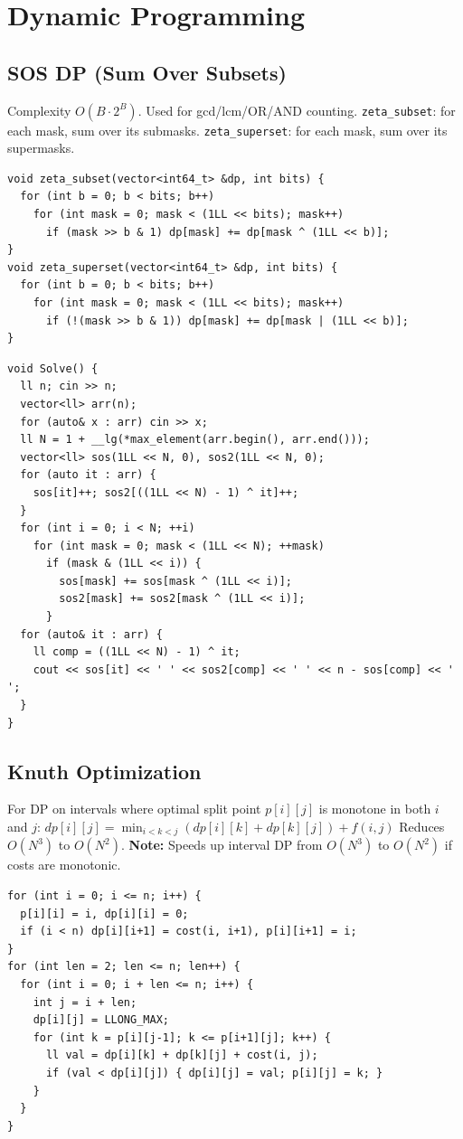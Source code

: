 \section{Dynamic Programming}
\subsection{SOS DP (Sum Over Subsets)}
Complexity $O(B \cdot 2^B)$. Used for gcd/lcm/OR/AND counting. \texttt{zeta\_subset}: for each mask, sum over its submasks. \texttt{zeta\_superset}: for each mask, sum over its supermasks.
\begin{verbatim}
void zeta_subset(vector<int64_t> &dp, int bits) {
  for (int b = 0; b < bits; b++)
    for (int mask = 0; mask < (1LL << bits); mask++)
      if (mask >> b & 1) dp[mask] += dp[mask ^ (1LL << b)];
}
void zeta_superset(vector<int64_t> &dp, int bits) {
  for (int b = 0; b < bits; b++)
    for (int mask = 0; mask < (1LL << bits); mask++)
      if (!(mask >> b & 1)) dp[mask] += dp[mask | (1LL << b)];
}
\end{verbatim}
\begin{verbatim}
void Solve() {
  ll n; cin >> n;
  vector<ll> arr(n);
  for (auto& x : arr) cin >> x;
  ll N = 1 + __lg(*max_element(arr.begin(), arr.end()));
  vector<ll> sos(1LL << N, 0), sos2(1LL << N, 0);
  for (auto it : arr) {
    sos[it]++; sos2[((1LL << N) - 1) ^ it]++;
  }
  for (int i = 0; i < N; ++i)
    for (int mask = 0; mask < (1LL << N); ++mask)
      if (mask & (1LL << i)) {
        sos[mask] += sos[mask ^ (1LL << i)];
        sos2[mask] += sos2[mask ^ (1LL << i)];
      }
  for (auto& it : arr) {
    ll comp = ((1LL << N) - 1) ^ it;
    cout << sos[it] << ' ' << sos2[comp] << ' ' << n - sos[comp] << ' ';
  }
}
\end{verbatim}

\subsection{Knuth Optimization}
For DP on intervals where optimal split point $p[i][j]$ is monotone in both $i$ and $j$:
$dp[i][j] = \min_{i<k<j} (dp[i][k] + dp[k][j]) + f(i, j)$
Reduces $O(N^3)$ to $O(N^2)$.
\textbf{Note:} Speeds up interval DP from $O(N^3)$ to $O(N^2)$ if costs are monotonic.
\begin{verbatim}
for (int i = 0; i <= n; i++) {
  p[i][i] = i, dp[i][i] = 0;
  if (i < n) dp[i][i+1] = cost(i, i+1), p[i][i+1] = i;
}
for (int len = 2; len <= n; len++) {
  for (int i = 0; i + len <= n; i++) {
    int j = i + len;
    dp[i][j] = LLONG_MAX;
    for (int k = p[i][j-1]; k <= p[i+1][j]; k++) {
      ll val = dp[i][k] + dp[k][j] + cost(i, j);
      if (val < dp[i][j]) { dp[i][j] = val; p[i][j] = k; }
    }
  }
}
\end{verbatim}
